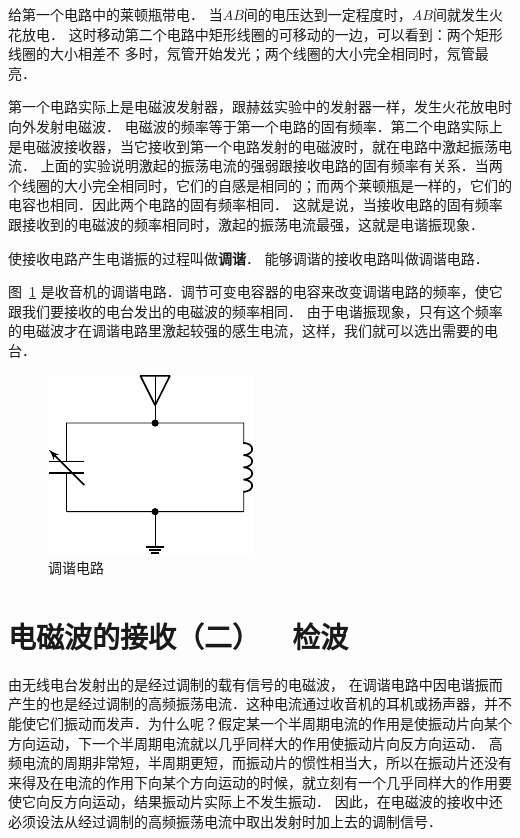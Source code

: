 给第一个电路中的莱顿瓶带电．
当$AB$间的电压达到一定程度时，$AB$间就发生火花放电．
这时移动第二个电路中矩形线圈的可移动的一边，可以看到：两个矩形线圈的大小相差不
多时，氖管开始发光；两个线圈的大小完全相同时，氖管最亮．

第一个电路实际上是电磁波发射器，跟赫兹实验中的发射器一样，发生火花放电时向外发射电磁波．
电磁波的频率等于第一个电路的固有频率．第二个电路实际上是电磁波接收器，当它接收到第一个电路发射的电磁波时，就在电路中激起振荡电流．
上面的实验说明激起的振荡电流的强弱跟接收电路的固有频率有关系．当两个线圈的大小完全相同时，它们的自感是相同的；而两个莱顿瓶是一样的，它们的电容也相同．因此两个电路的固有频率相同．
这就是说，当接收电路的固有频率跟接收到的电磁波的频率相同时，激起的振荡电流最强，这就是电谐振现象．

使接收电路产生电谐振的过程叫做\textbf{调谐}．
能够调谐的接收电路叫做调谐电路．


图~\ref{fig_C_4-17} 是收音机的调谐电路．调节可变电容器的电容来改变调谐电路的频率，使它跟我们要接收的电台发出的电磁波的频率相同．
由于电谐振现象，只有这个频率的电磁波才在调谐电路里激起较强的感生电流，这样，我们就可以选出需要的电台．
\begin{figure}[htbp]
	\centering
	\includegraphics{fig/C/4-17.pdf}
	\caption{调谐电路}\label{fig_C_4-17}
\end{figure}



\section{电磁波的接收（二）~~检波}
由无线电台发射出的是经过调制的载有信号的电磁波，
在调谐电路中因电谐振而产生的也是经过调制的高频振荡电流．这种电流通过收音机的耳机或扬声器，并不能使它们振动而发声．为什么呢？假定某一个半周期电流的作用是使振动片向某个方向运动，下一个半周期电流就以几乎同样大的作用使振动片向反方向运动．
高频电流的周期非常短，半周期更短，而振动片的惯性相当大，所以在振动片还没有来得及在电流的作用下向某个方向运动的时候，就立刻有一个几乎同样大的作用要使它向反方向运动，结果振动片实际上不发生振动．
因此，在电磁波的接收中还必须设法从经过调制的高频振荡电流中取出发射时加上去的调制信号．

